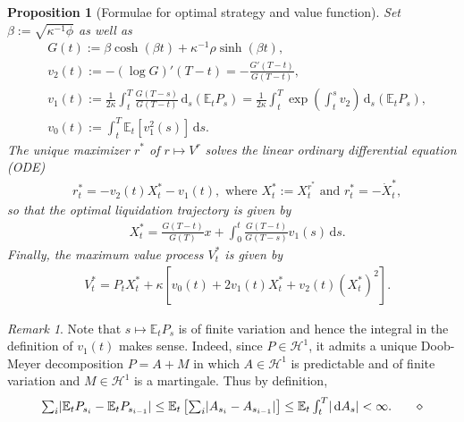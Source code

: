 \documentclass[openany,oneside]{article}
\newtheorem{prop}[thm]{Proposition}
\theoremstyle{definition}
\theoremstyle{remark}
\newtheorem{rem}[thm]{Remark}
\newcommand{\E}{\mathbb{E}} %
\DeclarePairedDelimiter{\abs}{\lvert}{\rvert} %
\newcommand{\ts}{\textstyle}
\newcommand{\closeEqn}{\tag*{$\diamond$}}
\newcommand{\de}{\,\mathrm{d}}
\begin{document}
\begin{prop}[Formulae for optimal strategy and value function]\label{main}
Set $\beta:=\sqrt{\kappa^{-1}\phi}$ as well as
\begin{align*}
&\ts G(t)  := \beta\cosh(\beta t)+\kappa^{-1}\rho\sinh(\beta t),\\
&\ts v_2(t):= -(\log G)'(T-t) = -\frac{G'(T-t)}{G(T-t)},\\
&\ts v_1(t):= \frac{1}{2\kappa}\int_t^T \frac{G(T-s)}{G(T-t)} \de_s(\E_t P_s) = \frac{1}{2\kappa}\int_t^T \exp\left(\int_t^s v_2\right) \de_s(\E_t P_s), \\
&\ts v_0(t):= \int_t^T \E_t[v_1^2(s)] \de s.
\end{align*}
The unique maximizer $r^\ast$ of $r\mapsto V^r$ solves the linear ordinary differential equation (ODE)
\begin{align*}
&\ts r^\ast_t = -v_2(t) X_t^{\ast} - v_1(t), \textrm{ where } X_t^{\ast} := X_t^{r^\ast} \textrm{ and } r^\ast_t = -\dot{X}^\ast_t,
\end{align*}
so that the optimal liquidation trajectory is given by
\begin{align*}
&\ts X^{\ast}_t = \frac{G(T-t)}{G(T)}x + \int_0^t \frac{G(T-t)}{G(T-s)} v_1(s) \de s.
\end{align*}
Finally, the maximum value process $V^\ast_t$ is given by
\begin{align*}
&\ts V^\ast_t = P_t X_t^{\ast} + \kappa\left[v_0(t) + 2 v_1(t) X_t^{\ast} + v_2(t) (X_t^{\ast})^2\right]. \closeEqn
\end{align*}
\end{prop}

\begin{rem}\label{RemIntegral}
Note that $s\mapsto \E_t P_s$ is of finite variation and hence the integral in the definition of $v_1(t)$ makes sense. Indeed, since $P\in \mathcal{H}^1$, it admits a unique Doob-Meyer decomposition $P=A+M$ in which $A\in\mathcal{H}^1$ is predictable and of finite variation and $M\in\mathcal{H}^1$ is a martingale. Thus by definition,
\[
 \ts \sum_i \abs{\E_t P_{s_i} - \E_t P_{s_{i-1}}} \le \E_t\left[\sum_i \abs{A_{s_i} - A_{s_{i-1}}}\right] \le \E_t \int_t^T \abs{\de A_s} < \infty.\closeEqn
\]
\end{rem}
\end{document}
